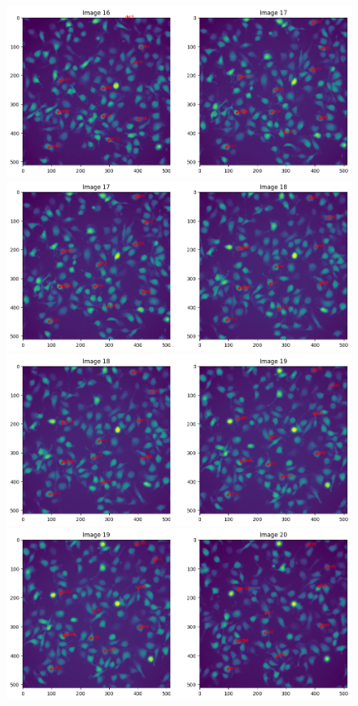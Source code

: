 \documentclass{article}
\begin{document}
\begin{figure}[h!]
\centering
\includegraphics[width=0.75\linewidth]{Report/RImages/Traces_Growth/trace-b17.png}
\includegraphics[width=0.75\linewidth]{Report/RImages/Traces_Growth/trace-b18.png}
\includegraphics[width=0.75\linewidth]{Report/RImages/Traces_Growth/trace-b19.png}
\includegraphics[width=0.75\linewidth]{Report/RImages/Traces_Growth/trace-b20.png}
\end{figure}

\clearpage
\end{document}
